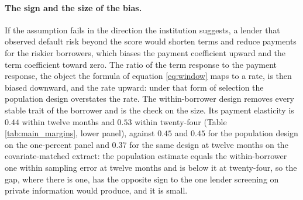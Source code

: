 \paragraph{The sign and the size of the bias.} If the assumption fails in the direction the institution suggests, a lender that observed default risk beyond the score would shorten terms and reduce payments for the riskier borrowers, which biases the payment coefficient upward and the term coefficient toward zero. The ratio of the term response to the payment response, the object the formula of equation \eqref{eq:window} maps to a rate, is then biased downward, and the rate upward: under that form of selection the population design overstates the rate. The within-borrower design removes every stable trait of the borrower and is the check on the size. Its payment elasticity is $0.44$ within twelve months and $0.53$ within twenty-four (Table \ref{tab:main_margins}, lower panel), against $0.45$ and $0.45$ for the population design on the one-percent panel and $0.37$ for the same design at twelve months on the covariate-matched extract: the population estimate equals the within-borrower one within sampling error at twelve months and is below it at twenty-four, so the gap, where there is one, has the opposite sign to the one lender screening on private information would produce, and it is small.

